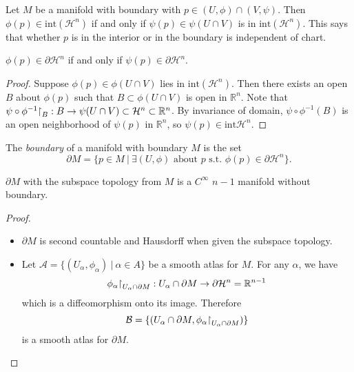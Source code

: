 \begin{prop}
Let $M$ be a manifold with boundary with
$p \in (U, \phi) \cap (V, \psi)$. Then
$\phi(p) \in \mathrm{int}(\mathcal{H}^n)$ if and only if
$\psi(p) \in \psi(U \cap V)$ is in $\mathrm{int}(\mathcal{H}^n)$.
This says that whether $p$ is in the interior or in the boundary is
independent of chart.
\end{prop}
\begin{corol}
$\phi(p) \in \partial \mathcal{H}^n$ if and only if
$\psi(p) \in \partial \mathcal{H}^n$.
\end{corol}

\begin{proof}
Suppose $\phi(p) \in \phi(U \cap V)$ lies in $\mathrm{int}
(\mathcal{H}^n)$. Then there exists an open $B$ about $\phi(p)$ such
that $B \subset \phi(U \cap V)$ is open in $\mathbb{R}^n$. Note that
$\psi \circ \phi^{-1}\mathord{\upharpoonright}_B : B \to \psi(U \cap V) \subset
\mathcal{H}^n \subset \mathbb{R}^n$. By invariance of domain,
$\psi \circ \phi^{-1}(B)$ is an open neighborhood of $\psi(p)$ in
$\mathbb{R}^n$, so $\psi(p) \in \mathrm{int} \mathcal{H}^n$.
\end{proof}

\begin{defn}
The \emph{boundary} of a manifold with boundary $M$ is the set
$$
  \partial M
= \{ p \in M ~\vert~
     \exists (U, \phi)
       \text{ about $p$ s.t. $\phi(p) \in \partial \mathcal{H}^n$}
  \}.
$$
\end{defn}

\begin{prop}
$\partial M$ with the subspace topology from $M$ is a $C^\infty$
$n-1$ manifold without boundary.
\end{prop}
\begin{proof}
  \begin{itemize}
    \item{
      $\partial M$ is second countable and Hausdorff when given the
      subspace topology.
    }
    \item{
      Let $\mathcal{A} = \{(U_\alpha, \phi_\alpha) ~\vert~ \alpha \in
      A\}$ be a smooth atlas for $M$. For any $\alpha$, we have
      $$
        \phi_\alpha\mathord{\upharpoonright}_{U_\alpha \cap \partial M}
      : U_\alpha \cap \partial M \to \partial \mathcal{H}^n
      = \mathbb{R}^{n-1}
      $$
      which is a diffeomorphism onto its image. Therefore
      $$
        \mathcal{B}
      = \{(U_\alpha \cap \partial M,
           \phi_\alpha \mathord{\upharpoonright}_{U_\alpha \cap \partial M})\}
      $$
      is a smooth atlas for $\partial M$.
    }
  \end{itemize}
\end{proof}

